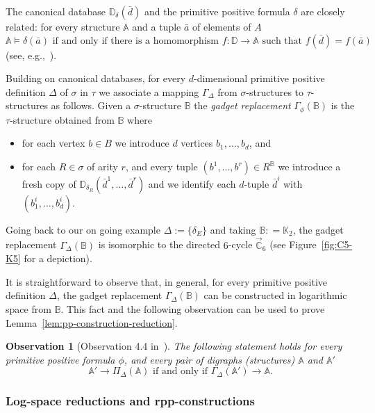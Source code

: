 \documentclass{article}
\newtheorem{observation}[theorem]{Observation}
\theoremstyle{definition}
\theoremstyle{remark}
\newcommand{\bA}{{\mathbb A}}
\newcommand{\bB}{{\mathbb B}}
\newcommand{\bC}{{\mathbb C}}
\newcommand{\bD}{{\mathbb D}}
\newcommand{\bK}{{\mathbb K}}
\begin{document}
The canonical database $\bD_\delta(\bar{d})$ and the primitive positive formula $\delta$
are closely related: for every structure $\bA$ and a tuple $\bar a$ of elements of $A$
\[
    \bA\models \delta(\bar a) \text{ if and only if there is a homomorphism }
    f\colon \bD\to \bA \text{ such that } f(\bar d) = f(\bar a)
\]
(see, e.g.,~\cite[Proposition 1.2.5]{Book}).

Building on canonical databases, for every $d$-dimensional
primitive positive definition $\Delta$ of $\sigma$ in $\tau$
we associate a mapping $\Gamma_\Delta$ from $\sigma$-structures to $\tau$-structures as follows.
Given a $\sigma$-structure $\bB$ the \emph{gadget replacement}
$\Gamma_\phi(\bB)$ is the $\tau$-structure obtained from $\bB$ where
\begin{itemize}
    \item for each vertex $b\in B$ we introduce $d$ vertices $b_1,\dots, b_d$, and
    \item for each $R\in \sigma$ of arity $r$, and every tuple $(b^1,\dots, b^r)\in R^\bB$
    we introduce a fresh copy of $\bD_{\delta_R}(\bar{d}^1, \dots, \bar{d}^r)$ 
    and we identify each $d$-tuple $\bar{d}^i$ with $(b_1^i,\dots, b_d^i)$.
\end{itemize}
Going back to our on going example $\Delta := \{\delta_E\}$ and taking $\bB : = \bK_2$, 
the gadget replacement $\Gamma_\Delta(\bB)$ is isomorphic to the directed
$6$-cycle $\vec{\bC}_6$ (see Figure~\ref{fig:C5-K5} for a depiction).

It is straightforward to observe that, in general, for every primitive positive
definition $\Delta$, the gadget replacement $\Gamma_\Delta(\bB)$
can be constructed in logarithmic space from $\bB$. This fact and the following
observation can be used to prove Lemma~\ref{lem:pp-construction-reduction}.

\begin{observation}
[Observation 4.4 in~\cite{krokhinSIAM23}]
\label{obs:adjoint}
The following statement holds for every primitive positive formula $\phi$,
and every pair of digraphs (structures) $\bA$ and $\bA'$
\[
    \bA' \to \Pi_\Delta(\bA) \text{ if and only if } \Gamma_\Delta(\bA')\to \bA.
\]
\end{observation}

\subsubsection*{Log-space reductions and rpp-constructions}
\label{subsec:rpp}
\end{document}
